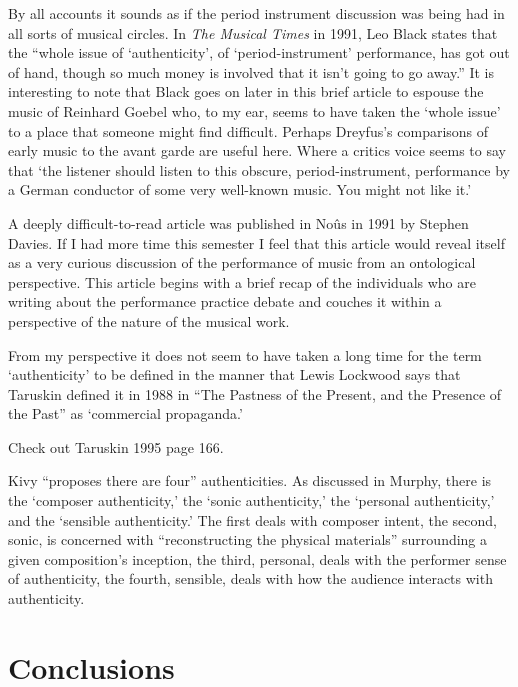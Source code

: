 \documentclass[12pt]{article}
\begin{document}
By all accounts it sounds as if the period instrument discussion was
being had in all sorts of musical circles. In \emph{The Musical Times}
in 1991, Leo Black states that the ``whole issue of `authenticity', of
`period-instrument' performance, has got out of hand, though so much
money is involved that it isn't going to go
away.''\autocite[64]{black1991} It is interesting to note that Black
goes on later in this brief article to espouse the music of Reinhard
Goebel who, to my ear, seems to have taken the `whole issue' to a
place that someone might find difficult. Perhaps Dreyfus's comparisons
of early music to the avant garde are useful here. Where a critics
voice seems to say that `the listener should listen to this obscure,
period-instrument, performance by a German conductor of some very
well-known music. You might not like it.'

A deeply difficult-to-read article was published in Noûs in 1991 by
Stephen Davies.\autocite{davies1991} If I had more time this semester
I feel that this article would reveal itself as a very curious
discussion of the performance of music from an ontological
perspective. This article begins with a brief recap of the individuals
who are writing about the performance practice debate and couches it
within a perspective of the nature of the musical work.

\nocite{sherr1991}

From my perspective it does not seem to have taken a long time for the
term `authenticity' to be defined in the manner that Lewis Lockwood
says that Taruskin defined it in 1988 in ``The Pastness of the
Present, and the Presence of the Past'' as `commercial propaganda.'\autocites[137]{taruskin1988}[as quoted in:][]{lockwood1991}

Check out Taruskin
1995 page 166.\autocite[166]{taruskin1995}

Kivy ``proposes there are four'' authenticities.\autocite{kivy1995} As
discussed in Murphy, there is the `composer authenticity,' the `sonic
authenticity,' the `personal authenticity,' and the `sensible
authenticity.'\autocite[26]{murphy2008} The first deals with composer
intent, the second, sonic, is concerned with ``reconstructing the
physical materials'' surrounding a given composition's inception, the
third, personal, deals with the performer sense of authenticity, the
fourth, sensible, deals with how the audience interacts with
authenticity.

\section{Conclusions}
\label{sec:conclusions}
\end{document}
